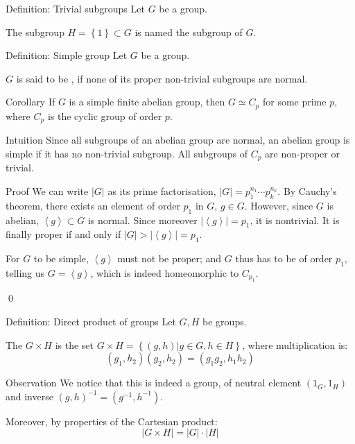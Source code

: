 \documentclass[a4paper]{article}
\begin{document}
\begin{parag}{Definition: Trivial subgroups}
    Let $G$ be a group.

    The subgroup $H = \left\{1\right\} \subset G$ is named the  subgroup of $G$.
\end{parag}

\begin{parag}{Definition: Simple group}
    Let $G$ be a group.

    $G$ is said to be , if none of its proper non-trivial subgroups are normal.
\end{parag}

\begin{parag}{Corollary}
    If $G$ is a simple finite abelian group, then $G \simeq C_p$ for some prime $p$, where $C_p$ is the cyclic group of order $p$.

    \begin{subparag}{Intuition}
        Since all subgroups of an abelian group are normal, an abelian group is simple if it has no non-trivial subgroup. All subgroups of $C_p$ are non-proper or trivial.
    \end{subparag}

    \begin{subparag}{Proof}
        We can write $\left|G\right|$ as its prime factorisation, $\left|G\right| = p_1^{n_1} \cdots p_k^{n_k}$. By Cauchy's theorem, there exists an element of order $p_1$ in $G$, $g \in G$. However, since $G$ is abelian, $\left\langle g \right\rangle \subset G$ is normal. Since moreover $\left|\left\langle g \right\rangle\right| = p_1$, it is nontrivial. It is finally proper if and only if $\left|G\right| > \left|\left\langle g \right\rangle\right| = p_1$.

        For $G$ to be simple, $\left\langle g \right\rangle$ must not be proper; and $G$ thus has to be of order $p_1$, telling us $G = \left\langle g \right\rangle$, which is indeed homeomorphic to $C_{p_1}$.

        \qed
    \end{subparag}
\end{parag}

\begin{parag}{Definition: Direct product of groups}
    Let $G, H$ be groups.

    The  $G \times H$ is the set $G \times H = \left\{\left(g, h\right) | g \in G, h \in H\right\}$, where multiplication is: 
    \[\left(g_1, h_2\right)\left(g_2, h_2\right) = \left(g_1 g_2, h_1 h_2\right)\]
    
    \begin{subparag}{Observation}
        We notice that this is indeed a group, of neutral element $\left(1_G, 1_H\right)$ and inverse $\left(g, h\right)^{-1} = \left(g^{-1}, h^{-1}\right)$.

        Moreover, by properties of the Cartesian product: 
        \[\left|G \times H\right| = \left|G\right|\cdot \left|H\right|\]
    \end{subparag}
\end{parag}
\end{document}
